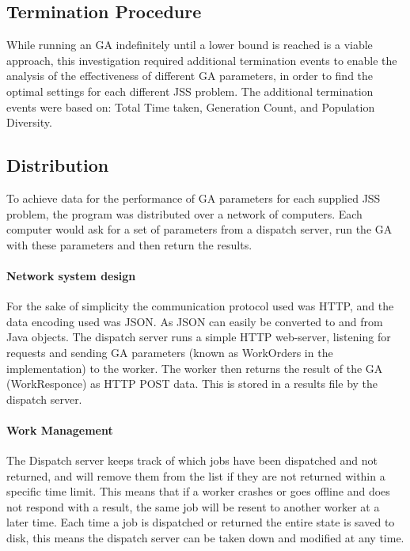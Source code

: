 \documentclass[14pt]{acmsiggraph}
\begin{document}
\subsection{Termination Procedure}
While running an GA indefinitely until a lower bound is reached is a viable approach, this investigation required additional termination events to enable the analysis of the effectiveness of different GA parameters, in order to find the optimal settings for each different JSS problem. The additional termination events were based on: Total Time taken, Generation Count, and Population Diversity.

\subsection{Distribution}
To achieve data for the performance of GA parameters for each supplied JSS problem, the program was distributed over a network of computers. Each computer would ask for a set of parameters from a dispatch server, run the GA with these parameters and then return the results.

\paragraph{Network system design}
For the sake of simplicity the communication protocol used was HTTP, and the data encoding used was JSON. As JSON can easily be converted to and from Java objects. The dispatch server runs a simple HTTP web-server, listening for requests and sending GA parameters (known as WorkOrders in the implementation) to the worker. The worker then returns the result of the GA (WorkResponce) as HTTP POST data. This is stored in a results file by the dispatch server. 

\paragraph{Work Management}
The Dispatch server keeps track of which jobs have been dispatched and not returned, and will remove them from the list if they are not returned within a specific time limit. This means that if a worker crashes or goes offline and does not respond with a result, the same job will be resent to another worker at a later time. Each time a job is dispatched or returned the entire state is saved to disk, this means the dispatch server can be taken down and modified at any time.
\end{document}
